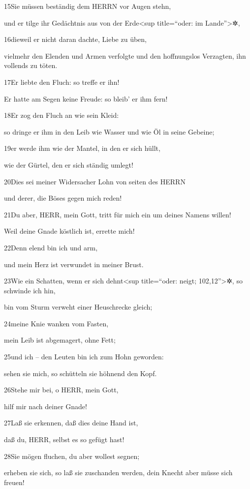 15Sie müssen beständig dem HERRN vor Augen stehn,

und er tilge ihr Gedächtnis aus von der Erde\textless sup title=``oder:
im Lande''\textgreater✲,

16dieweil er nicht daran dachte, Liebe zu üben,

vielmehr den Elenden und Armen verfolgte und den hoffnungslos Verzagten,
ihn vollends zu töten.

17Er liebte den Fluch: so treffe er ihn!

Er hatte am Segen keine Freude: so bleib' er ihm fern!

18Er zog den Fluch an wie sein Kleid:

so dringe er ihm in den Leib wie Wasser und wie Öl in seine Gebeine;

19er werde ihm wie der Mantel, in den er sich hüllt,

wie der Gürtel, den er sich ständig umlegt!

20Dies sei meiner Widersacher Lohn von seiten des HERRN

und derer, die Böses gegen mich reden!

21Du aber, HERR, mein Gott, tritt für mich ein um deines Namens willen!

Weil deine Gnade köstlich ist, errette mich!

22Denn elend bin ich und arm,

und mein Herz ist verwundet in meiner Brust.

23Wie ein Schatten, wenn er sich dehnt\textless sup title=``oder: neigt;
102,12''\textgreater✲, so schwinde ich hin,

bin vom Sturm verweht einer Heuschrecke gleich;

24meine Knie wanken vom Fasten,

mein Leib ist abgemagert, ohne Fett;

25und ich -- den Leuten bin ich zum Hohn geworden:

sehen sie mich, so schütteln sie höhnend den Kopf.

26Stehe mir bei, o HERR, mein Gott,

hilf mir nach deiner Gnade!

27Laß sie erkennen, daß dies deine Hand ist,

daß du, HERR, selbst es so gefügt hast!

28Sie mögen fluchen, du aber wollest segnen;

erheben sie sich, so laß sie zuschanden werden, dein Knecht aber müsse
sich freuen!

